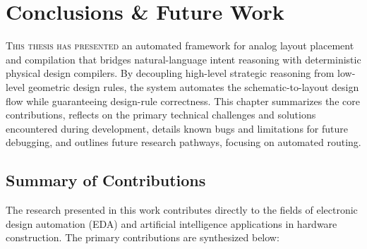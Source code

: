 
\chapter[Conclusions \& Future Work]{Conclusions \& Future Work}
\label{ch:conclusion}

\lettrine[lines=3]{T}{his thesis has presented} an automated framework for analog layout placement and compilation that bridges natural-language intent reasoning with deterministic physical design compilers. By decoupling high-level strategic reasoning from low-level geometric design rules, the system automates the schematic-to-layout design flow while guaranteeing design-rule correctness. This chapter summarizes the core contributions, reflects on the primary technical challenges and solutions encountered during development, details known bugs and limitations for future debugging, and outlines future research pathways, focusing on automated routing.

\section[Contributions Summary]{Summary of Contributions}
\label{sec:summary_contribs}

The research presented in this work contributes directly to the fields of electronic design automation (EDA) and artificial intelligence applications in hardware construction. The primary contributions are synthesized below:

